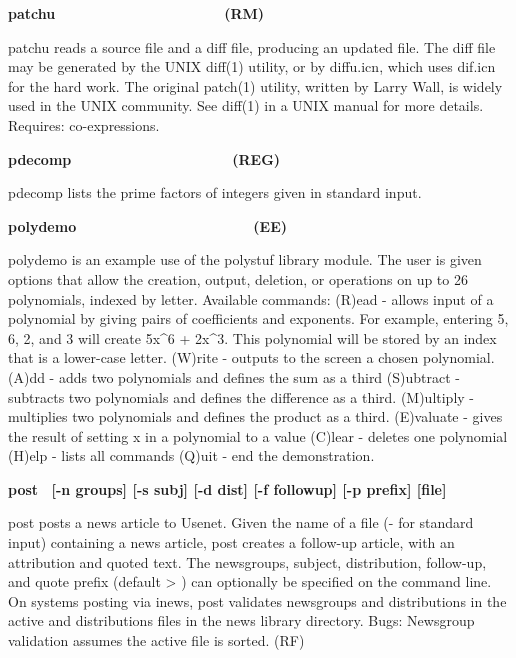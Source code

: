 {\sffamily\bfseries
patchu\ \ \ \ \ \ \ \ \ \ \ \ \ \ \ \ \ \ \ \  \ (RM)}

\textsf{patch}\textsf{u} reads a source file and a diff
file, producing an updated file. The diff file may be generated by the
UNIX \textsf{diff(1)} utility, or by \textsf{diffu.icn}, which uses
\textsf{dif.icn} for the hard work. The original \textsf{patch(1)}
utility, written by Larry Wall, is widely used in the UNIX community.
See \textsf{diff(1)} in a UNIX manual for more details. Requires:
co-expressions.

{\sffamily\bfseries
pdecomp\ \ \ \ \ \ \ \ \ \ \ \ \ \ \ \ \ \ \ \ (REG)}

\textsf{pdecomp} lists the prime factors of integers given in standard
input.

{\sffamily\bfseries
polydemo\ \ \ \ \ \ \ \ \ \ \ \ \ \ \ \ \ \ \ \  \ \ (EE)}

\textsf{polydemo} is an example use of the \textsf{polystuf} library
module. The user is given options that allow the creation, output,
deletion, or operations on up to 26 polynomials, indexed by letter.
Available commands: (R)ead - allows input of a polynomial by giving
pairs of coefficients and exponents. For example, entering 5, 6, 2, and
3 will create 5x\^{}6 + 2x\^{}3. This polynomial will be stored by an
index that is a lower-case letter. (W)rite - outputs to the screen a
chosen polynomial. (A)dd - adds two polynomials and defines the sum as
a third (S)ubtract - subtracts two polynomials and defines the
difference as a third. (M)ultiply - multiplies two polynomials and
defines the product as a third. (E)valuate - gives the result of
setting x in a polynomial to a value (C)lear - deletes one polynomial
(H)elp - lists all commands (Q)uit - end the demonstration.

{\sffamily\bfseries
post \ \textrm{\textmd{[-n groups] [-s subj] [-d dist] [-f followup] [-p
prefix] [file]}}}

\textsf{post} posts a news article to Usenet. Given the name
of a file (\textsf{{\textquotedbl}-{\textquotedbl}} for standard input)
containing a news article, \textsf{post} creates a follow-up article,
with an attribution and quoted text. The newsgroups, subject,
distribution, follow-up, and quote prefix (default
{\textquotesingle}{\textgreater} {\textquotesingle}) can optionally be
specified on the command line. On systems posting via \textsf{inews},
\textsf{post} validates newsgroups and distributions in the
\textsf{active} and \textsf{distributions} files in the news library
directory. Bugs: Newsgroup validation assumes the active file is
sorted. (RF)


